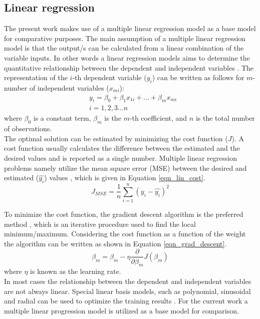 \documentclass[a4paper,fleqn]{cas-dc}
\begin{document}
\subsection{Linear regression}
The present work makes use of a multiple linear regression model as a base model for comparative purposes. The main assumption of a multiple linear regression model is that the output/s can be calculated from a linear combination of the variable inputs. In other words a linear regression models aims to determine the quantitative relationship between the dependent and independent variables \cite{Wen2022}. The representation of the $i$-th dependent variable ($y_i$) can be written as follows for $m$-number of independent variables ($x_{mi}$):
\begin{equation}
\begin{split}
&y_i = \beta_0+\beta_1x_{1i}+...+\beta_mx_{mi}\\
&i = 1,2,3...n
\end{split}
\end{equation}
where $\beta_0$ is a constant term, $\beta_{m}$ is the $m$-th coefficient, and $n$ is the total number of observations.\\
 
The optimal solution can be estimated by minimizing the cost function ($J$). A cost function usually calculates the difference between the estimated and the desired values and is reported as a single number. Multiple linear regression problems namely utilize the mean square error (MSE) between the desired and estimated ($\hat{y_i}$)  values \cite{Wheeler2019}, which is given in Equation \ref{eqn_lin_cost}.
 \begin{equation}\label{eqn_lin_cost}
J_{MSE}=\frac{1}{n}\sum^n_{i=1}(y_i-\hat{y_i})^2
\end{equation} 

To minimize the cost function, the gradient descent algorithm is the preferred method \cite{Wen2022}, which is an iterative procedure used to find the local minimum/maximum. Considering the cost function as a function of the weight the algorithm can be written as shown in Equation \ref{eqn_grad_descent}.  
\begin{equation}\label{eqn_grad_descent}
\beta_{m} = \beta_m-\eta\frac{\partial}{\partial\beta_m}J(\beta_m)
\end{equation}
where $\eta$ is known as the learning rate.\\

In most cases the relationship between the dependent and independent variables are not always linear. Special linear basis models, such as polynomial, sinusoidal and radial can be used to optimize the training results \cite{Rasmussen2006}. For the current work a multiple linear progression model is utilized as a base model for comparison. 
\end{document}
